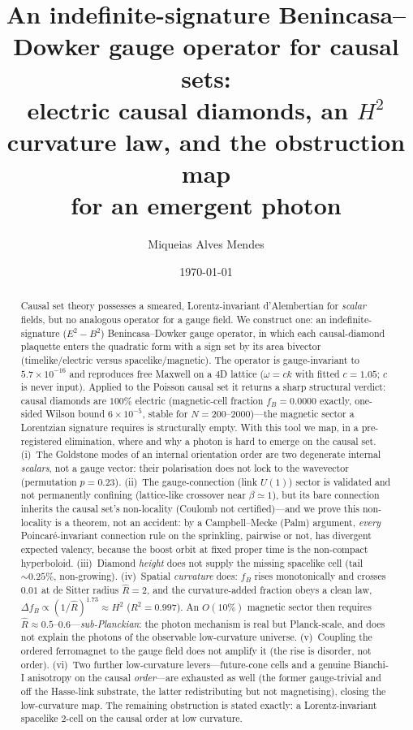 \documentclass[aps,prd,reprint,nofootinbib,superscriptaddress,floatfix]{revtex4-2}
\newcommand{\Rhat}{\hat R}
\newcommand{\fracB}{f_{\!B}}
\begin{document}
\title{An indefinite-signature Benincasa--Dowker gauge operator for causal sets:\\
electric causal diamonds, an $H^2$ curvature law, and the obstruction map\\
for an emergent photon}

\author{Miqueias Alves Mendes}
\date{\today}

\begin{abstract}
Causal set theory possesses a smeared, Lorentz-invariant d'Alembertian for \emph{scalar}
fields, but no analogous operator for a gauge field. We construct one: an
indefinite-signature ($E^2-B^2$) Benincasa--Dowker gauge operator, in which each
causal-diamond plaquette enters the quadratic form with a sign set by its area bivector
(timelike/electric versus spacelike/magnetic). The operator is gauge-invariant to
$5.7\times10^{-16}$ and reproduces free Maxwell on a $4$D lattice ($\omega=ck$ with
fitted $c=1.05$; $c$ is never input). Applied to the Poisson causal set it returns a
sharp structural verdict: causal diamonds are $100\%$ electric (magnetic-cell fraction
$\fracB=0.0000$ exactly, one-sided Wilson bound $6\times10^{-5}$, stable for
$N=200$--$2000$)---the magnetic sector a Lorentzian signature requires is structurally
empty. With this tool we map, in a pre-registered elimination, where and why a photon is
hard to emerge on the causal set. (i)~The Goldstone modes of an internal orientation
order are two degenerate internal \emph{scalars}, not a gauge vector: their polarisation
does not lock to the wavevector (permutation $p=0.23$). (ii)~The gauge-connection (link
$U(1)$) sector is validated and not permanently confining (lattice-like crossover near
$\beta\simeq1$), but its bare connection inherits the causal set's non-locality (Coulomb
not certified)---and we prove this non-locality is a theorem, not an accident: by a
Campbell--Mecke (Palm) argument, \emph{every} Poincar\'e-invariant connection rule on
the sprinkling, pairwise or not, has divergent expected valency, because the boost orbit
at fixed proper time is the non-compact hyperboloid. (iii)~Diamond \emph{height} does
not supply the missing spacelike cell (tail $\sim0.25\%$, non-growing). (iv)~Spatial
\emph{curvature} does: $\fracB$ rises monotonically and crosses $0.01$ at de Sitter
radius $\Rhat=2$, and the curvature-added fraction obeys a clean law,
$\Delta\fracB\propto(1/\Rhat)^{1.73}\approx H^2$ ($R^2=0.997$). An $O(10\%)$ magnetic
sector then requires $\Rhat\approx0.5$--$0.6$---\emph{sub-Planckian}: the photon
mechanism is real but Planck-scale, and does not explain the photons of the observable
low-curvature universe. (v)~Coupling the ordered ferromagnet to the gauge field does not
amplify it (the rise is disorder, not order). (vi)~Two further low-curvature
levers---future-cone cells and a genuine Bianchi-I anisotropy on the causal
\emph{order}---are exhausted as well (the former gauge-trivial and off the Hasse-link
substrate, the latter redistributing but not magnetising), closing the low-curvature
map. The remaining obstruction is stated exactly: a Lorentz-invariant spacelike $2$-cell
on the causal order at low curvature.
\end{abstract}
\end{document}
